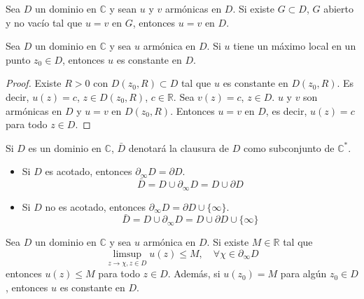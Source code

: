 \begin{corollary}
    Sea $D$ un dominio en $\mathbb{C}$ y sean $u$ y $v$ armónicas en $D$.
    Si existe $G \subset D$, $G$ abierto y no vacío tal que $u = v$ en $G$, entonces $u = v$ en $D$.
\end{corollary}

\begin{theorem}
    Sea $D$ un dominio en $\mathbb{C}$ y sea $u$ armónica en $D$.
    Si $u$ tiene un máximo local en un punto $z_0 \in D$, entonces $u$ es constante en $D$.
\end{theorem}

\begin{proof}
    Existe $R > 0$ con $D(z_0, R) \subset D$ tal que $u$ es constante en $D(z_0, R)$.
    Es decir, $u(z) = c$, $z \in D(z_0, R)$, $c \in \mathbb{R}$.
    Sea $v(z) = c$, $z \in D$.
    $u$ y $v$ son armónicas en $D$ y $u = v$ en $D(z_0, R)$.
    Entonces $u = v$ en $D$, es decir, $u(z) = c$ para todo $z \in D$.
\end{proof}

\begin{notation}
    Si $D$ es un dominio en $\mathbb{C}$, $\bar{D}$ denotará la clausura de $D$ como subconjunto de $\mathbb{C}^\ast$.
    \begin{itemize}
        \item Si $D$ es acotado, entonces $\partial_\infty D = \partial D$.
              $$\bar{D} = D \cup \partial_\infty D = D \cup \partial D$$
        \item Si $D$ no es acotado, entonces $\partial_\infty D = \partial D \cup \{\infty\}$.
              $$\bar{D} = D \cup \partial_\infty D = D \cup \partial D \cup \{\infty\}$$
    \end{itemize}
\end{notation}

\begin{theorem}
    Sea $D$ un dominio en $\mathbb{C}$ y sea $u$ armónica en $D$.
    Si existe $M \in \mathbb{R}$ tal que
    $$\limsup_{z \to \chi, z \in D} u(z) \leq M, \quad \forall \chi \in \partial_\infty D$$
    entonces $u(z) \leq M$ para todo $z \in D$.
    Además, si $u(z_0) = M$ para algún $z_0 \in D$, entonces $u$ es constante en $D$.
\end{theorem}


